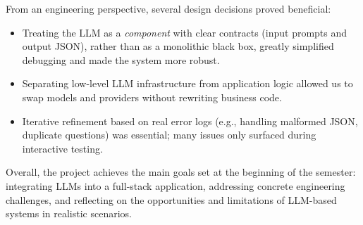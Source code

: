 \documentclass[11pt,a4paper]{article}
\begin{document}
From an engineering perspective, several design decisions proved beneficial:

\begin{itemize}
    \item Treating the LLM as a \emph{component} with clear contracts (input prompts and output JSON), rather than as a monolithic black box, greatly simplified debugging and made the system more robust.
    \item Separating low-level LLM infrastructure from application logic allowed us to swap models and providers without rewriting business code.
    \item Iterative refinement based on real error logs (e.g., handling malformed JSON, duplicate questions) was essential; many issues only surfaced during interactive testing.
\end{itemize}

Overall, the project achieves the main goals set at the beginning of the semester: integrating LLMs into a full-stack application, addressing concrete engineering challenges, and reflecting on the opportunities and limitations of LLM-based systems in realistic scenarios.
\end{document}
